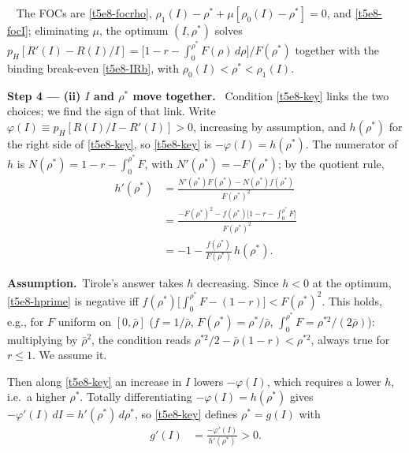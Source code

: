 \documentclass[11pt,a4paper]{article}
\newcommand{\step}[2]{\par\medskip\noindent\textbf{Step #1 --- #2.}~}
\newcommand{\assume}{\par\smallskip\noindent\textbf{Assumption.}~}
\newcommand{\answer}[1]{\par\smallskip\noindent\fbox{\textbf{Answer #1.}}~}
\begin{document}
\answer{(i)} The FOCs are \eqref{t5e8-focrho}, $\rho_1(I)-\rho^*+\mu[\rho_0(I)-\rho^*]=0$, and
\eqref{t5e8-focI}; eliminating $\mu$, the optimum $(I,\rho^*)$ solves
$p_H[R'(I)-R(I)/I]=\bigl[1-r-\int_0^{\rho^*}F(\rho)\,d\rho\bigr]/F(\rho^*)$ together with the binding
break-even \eqref{t5e8-IRb}, with $\rho_0(I)<\rho^*<\rho_1(I)$.

\step{4}{(ii) $I$ and $\rho^*$ move together} Condition \eqref{t5e8-key} links the two choices; we find
the sign of that link. Write $\varphi(I)\equiv p_H[R(I)/I-R'(I)]>0$, increasing by assumption, and
$h(\rho^*)$ for the right side of \eqref{t5e8-key}, so \eqref{t5e8-key} is $-\varphi(I)=h(\rho^*)$. The
numerator of $h$ is $N(\rho^*)=1-r-\int_0^{\rho^*}F$, with $N'(\rho^*)=-F(\rho^*)$; by the quotient rule,
\begin{align}
  h'(\rho^*) &= \frac{N'(\rho^*)F(\rho^*)-N(\rho^*)f(\rho^*)}{F(\rho^*)^2} \nonumber\\
             &= \frac{-F(\rho^*)^2 - f(\rho^*)\big[1-r-\int_0^{\rho^*}F\big]}{F(\rho^*)^2} \nonumber\\
             &= -1 - \frac{f(\rho^*)}{F(\rho^*)}\,h(\rho^*). \label{t5e8-hprime}
\end{align}
\assume Tirole's answer takes $h$ decreasing. Since $h<0$ at the optimum, \eqref{t5e8-hprime} is negative iff
$f(\rho^*)\big[\int_0^{\rho^*}F-(1-r)\big]<F(\rho^*)^2$. This holds, e.g., for $F$ uniform on $[0,\bar\rho]$
($f=1/\bar\rho$, $F(\rho^*)=\rho^*/\bar\rho$, $\int_0^{\rho^*}F=\rho^{*2}/(2\bar\rho)$): multiplying by $\bar\rho^2$, the
condition reads $\rho^{*2}/2-\bar\rho(1-r)<\rho^{*2}$, always true for $r\le1$. We assume it.

Then along \eqref{t5e8-key} an increase in $I$ lowers $-\varphi(I)$, which requires a lower $h$, i.e.\ a higher
$\rho^*$. Totally differentiating $-\varphi(I)=h(\rho^*)$ gives $-\varphi'(I)\,dI=h'(\rho^*)\,d\rho^*$, so
\eqref{t5e8-key} defines $\rho^*=g(I)$ with
\begin{align}
  g'(I) &= \frac{-\varphi'(I)}{h'(\rho^*)} > 0. \label{t5e8-g}
\end{align}
\end{document}
